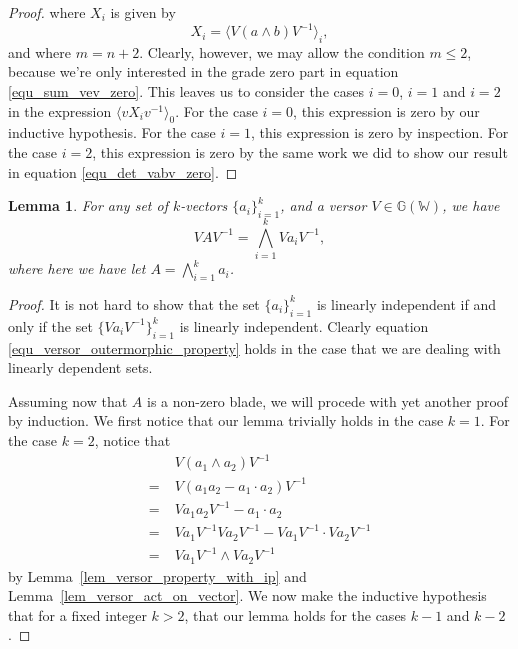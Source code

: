 \documentclass{birkjour}
\newtheorem{lem}[thm]{Lemma}
\theoremstyle{definition}
\theoremstyle{remark}
\numberwithin{equation}{section}
\newcommand{\G}{\mathbb{G}}
\newcommand{\W}{\mathbb{W}}
\begin{document}
\begin{proof}
where $X_i$ is given by
\begin{equation}
X_i = \langle V(a\wedge b)V^{-1}\rangle_i,
\end{equation}
and where $m=n+2$.  Clearly, however, we may allow the condition $m\leq 2$, because
we're only interested in the grade zero part in equation \eqref{equ_sum_vev_zero}.  This leaves us to
consider the cases $i=0$, $i=1$ and $i=2$ in the expression $\langle vX_iv^{-1}\rangle_0$.
For the case $i=0$, this expression is zero by our inductive hypothesis.
For the case $i=1$, this expression is zero by inspection.  For the case $i=2$, this
expression is zero by the same work we did to show our result in equation \eqref{equ_det_vabv_zero}.
\end{proof}

\begin{lem}\label{lem_versor_outermorphic_property}
For any set of $k$-vectors $\{a_i\}_{i=1}^k$, and a versor $V\in\G(\W)$,
we have
\begin{equation}\label{equ_versor_outermorphic_property}
VAV^{-1} = \bigwedge_{i=1}^k Va_iV^{-1},
\end{equation}
where here we have let $A=\bigwedge_{i=1}^k a_i$.
\end{lem}
\begin{proof}
It is not hard to show that the set $\{a_i\}_{i=1}^k$ is linearly
independent if and only if the set $\{Va_iV^{-1}\}_{i=1}^k$ is
linearly independent.  Clearly equation \eqref{equ_versor_outermorphic_property} holds in the
case that we are dealing with linearly dependent sets.

Assuming now that $A$ is a non-zero blade, we will procede with yet
another proof by induction.  We first notice that our lemma trivially holds in the case $k=1$.
For the case $k=2$, notice that
\begin{align}
 & V(a_1\wedge a_2)V^{-1} \\
 =\;& V(a_1a_2-a_1\cdot a_2)V^{-1} \\
 =\;& Va_1a_2V^{-1}-a_1\cdot a_2 \\
 =\;& Va_1V^{-1}Va_2V^{-1}-Va_1V^{-1}\cdot Va_2V^{-1} \\
 =\;& Va_1V^{-1}\wedge Va_2V^{-1}
\end{align}
by Lemma~\ref{lem_versor_property_with_ip} and Lemma~\ref{lem_versor_act_on_vector}.
We now make the inductive hypothesis that for a fixed integer $k>2$, that our
lemma holds for the cases $k-1$ and $k-2$.


\end{proof}
\end{document}
